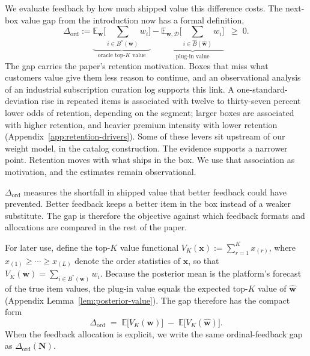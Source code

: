 \documentclass[11pt]{article}
\theoremstyle{definition}
\theoremstyle{remark}
\newcommand{\E}{\mathbb{E}}
\newcommand{\1}{\mathbf{1}}
\newcommand{\w}{\mathbf{w}}
\newcommand{\N}{\mathbf{N}}
\begin{document}
We evaluate feedback by how much shipped value this difference costs.
The next-box value gap from the introduction now has a formal
definition,
\begin{equation}\label{eq:def-delta}
\Delta_{\mathrm{ord}}
:=
\underbrace{\mathbb E_{\w}\!\Big[\sum_{i\in B^*(\w)} w_i\Big]}_{\text{oracle top-$K$ value}}
-
\underbrace{\mathbb E_{\w,\mathcal D}\!\Big[\sum_{i\in \hat B(\hat{\w})} w_i\Big]}_{\text{plug-in value}}
\;\;\ge\;0.
\end{equation}
The gap carries the paper's retention motivation. Boxes that miss what
customers value give them less reason to continue, and an observational
analysis of an industrial subscription curation log supports this link.
A one-standard-deviation rise in repeated items is associated with
twelve to thirty-seven percent lower odds of retention, depending on
the segment; larger boxes are associated with higher retention, and
heavier premium intensity with lower retention
(Appendix~\ref{app:retention-drivers}). Some of these levers sit upstream of our weight model, in the catalog
construction. The evidence supports a narrower point. Retention moves
with what ships in the box. We use that association as motivation, and
the estimates remain observational.

\(\Delta_{\mathrm{ord}}\) measures the shortfall in shipped value that better feedback could have prevented. Better feedback keeps a better item in the box instead of a weaker substitute. The gap is therefore the objective against which feedback formats and allocations are compared in the rest of the paper.

For later use, define the top-$K$ value functional
\(V_K(\mathbf x) := \sum_{r=1}^{K} x_{(r)}\), where
$x_{(1)} \ge \cdots \ge x_{(L)}$ denote the order statistics of
$\mathbf x$, so that $V_K(\w)=\sum_{i\in B^*(\w)} w_i$. Because the
posterior mean is the platform's forecast of the true item values, the
plug-in value equals the expected top-\(K\) value of \(\hat{\mathbf w}\)
(Appendix Lemma~\ref{lem:posterior-value}). The gap therefore has the
compact form
\begin{equation}\label{eq:delta-VK}
\Delta_{\mathrm{ord}} \;=\; \E\!\big[V_K(\w)\big]\;-\;\E\!\big[V_K(\hat{\w})\big].
\end{equation}
When the feedback allocation is explicit, we write the same
ordinal-feedback gap as \(\Delta_{\mathrm{ord}}(\N)\).
\end{document}
